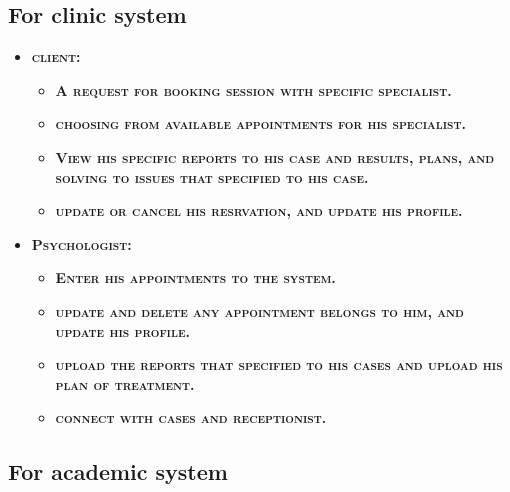 \documentclass[../Psychological_system_web_application.tex]{subfiles}
\begin{document}
				\subsection{For clinic system}
				\begin{itemize}
					\item
							\textbf{\textsc{\color{red}client:}}
					\begin{itemize}
						\item
							\textbf{\textsc{\color{blue}A request for booking session with specific specialist.}}
						\item
							\textbf{\textsc{\color{blue}choosing from available appointments for his specialist.}}
						\item
							\textbf{\textsc{\color{blue}View his specific reports to his case and results, plans, and solving to issues that specified to his case.}}
						\item
							\textbf{\textsc{\color{blue}update or cancel his resrvation, and update his profile.}}
					\end{itemize}
					
					\item
							\textbf{\textsc{\color{red}Psychologist:}}
							\begin{itemize}
							\item
								\textbf{\textsc{\color{blue}Enter his appointments to the system.}}
							\item
								\textbf{\textsc{\color{blue}update and delete any appointment belongs to him, and update his profile.}}
							\item
								\textbf{\textsc{\color{blue}upload the reports that specified to his cases and upload his plan of treatment.}}
							\item
								\textbf{\textsc{\color{blue}connect with cases and receptionist.}}
					\end{itemize}
				\end{itemize}
				
				\subsection{For academic system}
				
\end{document}
